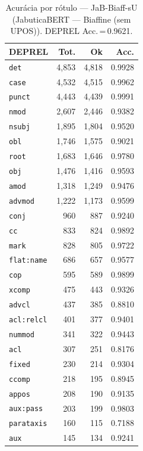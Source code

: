 \begin{table}[ht]
\centering
\caption{Acurácia por rótulo --- JaB-Biaff-sU (JabuticaBERT — Biaffine (sem UPOS)). DEPREL Acc.\,=\,0.9621.}
\label{tab:acc-predict-test-ablacao-biaffine-amadeusai-modernJabuticaBERT-Base-1k}
\scriptsize
\begin{tabular}{lrrr}
\toprule
\textbf{DEPREL} & \textbf{Tot.} & \textbf{Ok} & \textbf{Acc.} \\
\midrule
\texttt{det} & 4,853 & 4,818 & 0.9928 \\
\texttt{case} & 4,532 & 4,515 & 0.9962 \\
\texttt{punct} & 4,443 & 4,439 & 0.9991 \\
\texttt{nmod} & 2,607 & 2,446 & 0.9382 \\
\texttt{nsubj} & 1,895 & 1,804 & 0.9520 \\
\texttt{obl} & 1,746 & 1,575 & 0.9021 \\
\texttt{root} & 1,683 & 1,646 & 0.9780 \\
\texttt{obj} & 1,476 & 1,416 & 0.9593 \\
\texttt{amod} & 1,318 & 1,249 & 0.9476 \\
\texttt{advmod} & 1,222 & 1,173 & 0.9599 \\
\texttt{conj} & 960 & 887 & 0.9240 \\
\texttt{cc} & 833 & 824 & 0.9892 \\
\texttt{mark} & 828 & 805 & 0.9722 \\
\texttt{flat\!:\!name} & 686 & 657 & 0.9577 \\
\texttt{cop} & 595 & 589 & 0.9899 \\
\texttt{xcomp} & 475 & 443 & 0.9326 \\
\texttt{advcl} & 437 & 385 & 0.8810 \\
\texttt{acl\!:\!relcl} & 401 & 377 & 0.9401 \\
\texttt{nummod} & 341 & 322 & 0.9443 \\
\texttt{acl} & 307 & 251 & 0.8176 \\
\texttt{fixed} & 230 & 214 & 0.9304 \\
\texttt{ccomp} & 218 & 195 & 0.8945 \\
\texttt{appos} & 208 & 190 & 0.9135 \\
\texttt{aux\!:\!pass} & 203 & 199 & 0.9803 \\
\texttt{parataxis} & 160 & 115 & 0.7188 \\
\texttt{aux} & 145 & 134 & 0.9241 \\

\end{tabular}
\end{table}
